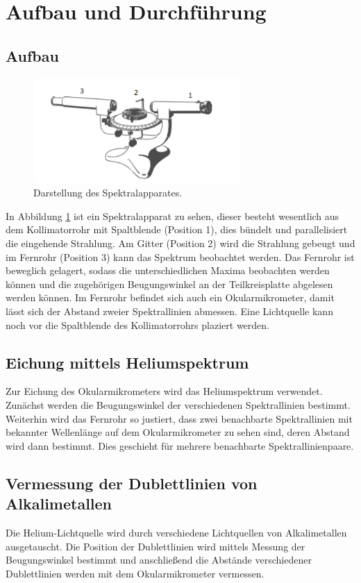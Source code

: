 \newpage
\section{Aufbau und Durchführung}
\label{sec:Durchführung}
\subsection{Aufbau}
\begin{figure}
 \centering
 \includegraphics[width=0.7\textwidth]{Aufbau.png}
 \caption{Darstellung des Spektralapparates.\cite{sample}}
 \label{fig:apparat}
 \end{figure}
In Abbildung \ref{fig:apparat} ist ein Spektralapparat zu sehen, dieser besteht wesentlich aus dem Kollimatorrohr mit Spaltblende (Position 1), dies bündelt und parallelisiert die eingehende Strahlung.
Am Gitter (Position 2) wird die Strahlung gebeugt und im Fernrohr (Position 3) kann das Spektrum beobachtet werden. Das Fernrohr ist beweglich gelagert, sodass die unterschiedlichen Maxima
beobachten werden können und die zugehörigen Beugungswinkel an der Teilkreisplatte abgelesen werden können. Im Fernrohr befindet sich auch ein Okularmikrometer, damit lässt sich der Abstand
zweier Spektrallinien abmessen.
Eine Lichtquelle kann noch vor die Spaltblende des Kollimatorrohrs plaziert werden.

\subsection{Eichung mittels Heliumspektrum}
Zur Eichung des Okularmikrometers wird das Heliumspektrum verwendet. Zunächst werden die Beugungswinkel der verschiedenen Spektrallinien bestimmt.
Weiterhin wird das Fernrohr so justiert, dass zwei benachbarte Spektrallinien mit bekannter Wellenlänge auf dem Okularmikrometer zu sehen sind, deren Abstand wird dann bestimmt.
Dies geschieht für mehrere benachbarte Spektrallinienpaare.

\subsection{Vermessung der Dublettlinien von Alkalimetallen}
Die Helium-Lichtquelle wird durch verschiedene Lichtquellen von Alkalimetallen ausgetauscht.
Die Position der Dublettlinien wird mittels Messung der Beugungswinkel bestimmt und
anschließend die Abstände verschiedener Dublettlinien werden mit dem Okularmikrometer vermessen.
